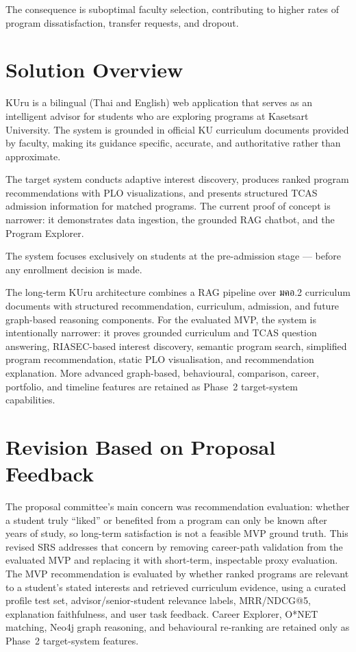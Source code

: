 The consequence is suboptimal faculty selection, contributing to higher rates of program dissatisfaction, transfer requests, and dropout.

\section{Solution Overview}
\label{section:solution-overview}

KUru is a bilingual (Thai and English) web application that serves as an intelligent advisor for students who are exploring programs at Kasetsart University. The system is grounded in official KU curriculum documents provided by faculty, making its guidance specific, accurate, and authoritative rather than approximate.

The target system conducts adaptive interest discovery, produces ranked program recommendations with PLO visualizations, and presents structured TCAS admission information for matched programs. The current proof of concept is narrower: it demonstrates data ingestion, the grounded RAG chatbot, and the Program Explorer.

The system focuses exclusively on students at the pre-admission stage --- before any enrollment decision is made.

The long-term KUru architecture combines a RAG pipeline over มคอ.2 curriculum documents with structured recommendation, curriculum, admission, and future graph-based reasoning components. For the evaluated MVP, the system is intentionally narrower: it proves grounded curriculum and TCAS question answering, RIASEC-based interest discovery, semantic program search, simplified program recommendation, static PLO visualisation, and recommendation explanation. More advanced graph-based, behavioural, comparison, career, portfolio, and timeline features are retained as Phase~2 target-system capabilities.

\section{Revision Based on Proposal Feedback}
\label{section:proposal-feedback-revision}

The proposal committee's main concern was recommendation evaluation: whether a student truly ``liked'' or benefited from a program can only be known after years of study, so long-term satisfaction is not a feasible MVP ground truth. This revised SRS addresses that concern by removing career-path validation from the evaluated MVP and replacing it with short-term, inspectable proxy evaluation. The MVP recommendation is evaluated by whether ranked programs are relevant to a student's stated interests and retrieved curriculum evidence, using a curated profile test set, advisor/senior-student relevance labels, MRR/NDCG@5, explanation faithfulness, and user task feedback. Career Explorer, O*NET matching, Neo4j graph reasoning, and behavioural re-ranking are retained only as Phase~2 target-system features.

